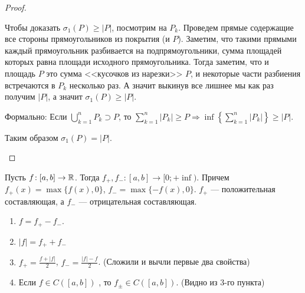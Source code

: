 \begin{proof}
\begin{enumerate}
		Чтобы доказать $\sigma_1(P) \ge |P|$, посмотрим на $P_k$. Проведем прямые содержащие все стороны прямоугольников из покрытия (и $P$). Заметим, что такими прямыми каждый прямоугольник разбивается на подпрямоугольники, сумма площадей которых равна площади исходного прямоугольника. Тогда заметим, что и площадь $P$ это сумма <<кусочков из нарезки>> $P$, и некоторые части разбиения встречаются в  $P_k$ несколько раз. А значит выкинув все лишнее мы как раз получим  $|P|$, а значит  $\sigma_1(P) \ge |P|$.
		
		Формально: Если $\bigcup\limits_{k=1}^n P_k \supset P$, то $\sum\limits_{k=1}^n |P_k| \ge P \Rightarrow \inf \left\{\sum\limits_{k=1}^n |P_k|\right\} \ge |P|$.
		
		Таким образом $\sigma_1(P) = |P|$.
    \end{enumerate}
\end{proof}
\begin{definition}
    Пусть $f\!: [a, b] \to \mathbb{R}$. Тогда  $f_+, f_-\!: [a, b] \to [0; +\inf)$. Причем  $f_+(x) = \max\{f(x), 0\}$,  $f_- = \max\{-f(x), 0\}$. $f_+$ --- положительная составляющая, а $f_-$ --- отрицательная составляющая.
\end{definition}
\begin{properties}
    \begin{enumerate}
        \item $f = f_+ - f_-$.
        \item  $|f| = f_+ + f_-$
        \item  $f_+ = \frac{f + |f|}{2}$, $f_- = \frac{|f| - f}{2}$. (Сложили и вычли первые два свойства)
        \item Если $f \in C([a, b])$ , то  $f_{\pm} \in C([a, b])$. (Видно из 3-го пункта)
    \end{enumerate}
\end{properties}

